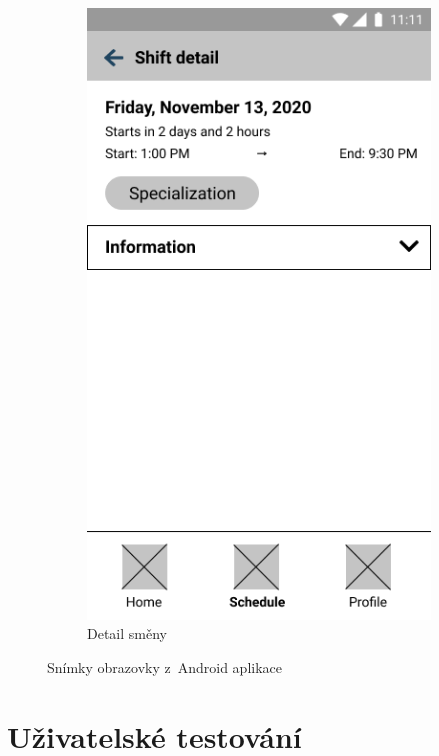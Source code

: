 \documentclass[twoside]{ctuthesis}
\begin{document}
\begin{figure}
\begin{subfigure}{0.34\textwidth}
         \includegraphics[width=\textwidth]{img/shift-detail.png}
         \caption{Detail směny}
         \label{sub:android4}
     \end{subfigure}
	\caption{Snímky obrazovky z~Android aplikace}
	\label{fig:screenshots}
\end{figure}

\chapter{Uživatelské testování}
\end{document}
